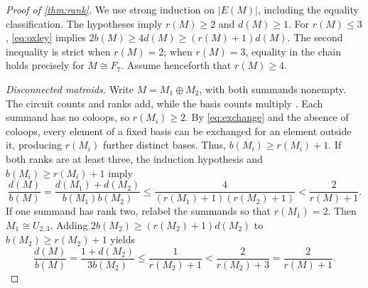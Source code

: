 \documentclass[10pt,a4paper]{article}
\numberwithin{equation}{section}
\begin{document}
\begin{proof}[Proof of \autoref{thm:rank}]
We use strong induction on \(|E(M)|\), including the equality classification.
The hypotheses imply \(r(M)\ge2\) and \(d(M)\ge1\).
For \(r(M)\le3\), \eqref{eq:oxley} implies
\(2b(M)\ge4d(M)\ge(r(M)+1)d(M)\).
The second inequality is strict when \(r(M)=2\); when \(r(M)=3\),
equality in the chain holds precisely for \(M\cong F_7\).
Assume henceforth that \(r(M)\ge4\).

\emph{Disconnected matroids.}
Write \(M=M_1\oplus M_2\), with both summands nonempty.
The circuit counts and ranks add, while the basis counts multiply
\cite[(4.2.12)--(4.2.14)]{Oxley2011}.
Each summand has no coloops, so \(r(M_i)\ge2\).
By \eqref{eq:exchange} and the absence of coloops, every element of a
fixed basis can be exchanged for an element outside it, producing
\(r(M_i)\) further distinct bases.
Thus, \(b(M_i)\ge r(M_i)+1\).
If both ranks are at least three, the induction hypothesis and
\(b(M_i)\ge r(M_i)+1\) imply
\[
 \frac{d(M)}{b(M)}
 =\frac{d(M_1)+d(M_2)}{b(M_1)b(M_2)}
 \le\frac4{(r(M_1)+1)(r(M_2)+1)}
 <\frac2{r(M)+1}.
\]
If one summand has rank two, relabel the summands so that
\(r(M_1)=2\). Then \(M_1\cong U_{2,3}\).
Adding \(2b(M_2)\ge(r(M_2)+1)d(M_2)\) to
\(b(M_2)\ge r(M_2)+1\) yields
\[
 \frac{d(M)}{b(M)}
 =\frac{1+d(M_2)}{3b(M_2)}
 \le\frac1{r(M_2)+1}
 <\frac2{r(M_2)+3}=\frac2{r(M)+1}.
\]


\end{proof}
\end{document}
